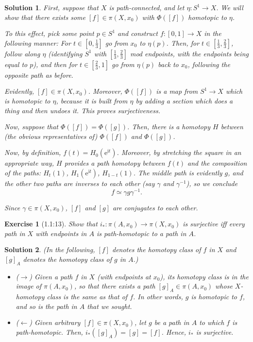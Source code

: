 \documentclass{article}
\theoremstyle{plain}
\newtheorem*{ex}{Exercise}
\theoremstyle{nonumberplain}
\newtheorem{sol}{Solution}
\newcommand{\I}{\mathrm{i}}
\newcommand{\e}{\mathrm{e}}
\begin{document}
\begin{sol}
First, suppose that $X$ is path-connected, and let $\eta \colon S^1 \to X$. We will show that there exists some $[f] \in \pi(X,x_0)$ with $\Phi([f])$ homotopic to $\eta$.

To this effect, pick some point $p \in S^1$ and construct $f \colon [0,1] \to X$ in the following manner: For $t \in [0,\frac13]$ go from $x_0$ to $\eta(p)$. Then, for $t \in [\frac13,\frac23]$, follow along $\eta$ (identifying $S^1$ with $[\frac13,\frac23]$ mod endpoints, with the endpoints being equal to $p$), and then for $t \in [\frac23,1]$ go from $\eta(p)$ back to $x_0$, following the opposite path as before.

Evidently, $[f] \in \pi(X,x_0)$. Moreover, $\Phi([f])$ is a map from $S^1 \to X$ which is homotopic to $\eta$, because it is built from $\eta$ by adding a section which does a thing and then undoes it. This proves surjectiveness.

\smallskip

Now, suppose that $\Phi([f]) = \Phi([g])$. Then, there is a homotopy $H$ between (the obvious representatives of) $\Phi([f])$ and $\Phi([g])$.

Now, by definition, $f(t) = H_0(\e^{\I t})$. Moreover, by stretching the square in an appropriate way, $H$ provides a path homotopy between $f(t)$ and the composition of the paths: $H_t(1)$, $H_1(\e^{\I t})$, $H_{1-t}(1)$. The middle path is evidently $g$, and the other two paths are inverses to each other (say $\gamma$ and $\gamma^{-1}$), so we conclude
\begin{equation}
f \simeq \gamma g \gamma^{-1}.
\end{equation}

Since $\gamma \in \pi(X,x_0)$, $[f]$ and $[g]$ are conjugates to each other.
\end{sol}

\begin{ex}[1.1:13]
Show that $i_* \colon \pi(A,x_0) \to \pi(X,x_0)$ is surjective iff every path in $X$ with endpoints in $A$ is path-homotopic to a path in $A$.
\end{ex}

\begin{sol} (In the following, $[f]$ denotes the homotopy class of $f$ in $X$ and $[g]_A$ denotes the homotopy class of $g$ in $A$.)
\begin{itemize}
\item ($\rightarrow$) Given a path $f$ in $X$ (with endpoints at $x_0$), its homotopy class is in the image of $\pi(A,x_0)$, so that there exists a path $[g]_A \in \pi(A,x_0)$ whose $X$-homotopy class is the same as that of $f$. In other words, $g$ is homotopic to $f$, and so is the path in $A$ that we sought.

\item ($\leftarrow$) Given arbitrary $[f] \in \pi(X,x_0)$, let $g$ be a path in $A$ to which $f$ is path-homotopic. Then, $i_*([g]_A) = [g] = [f]$. Hence, $i_*$ is surjective.
\end{itemize}
\end{sol}
\end{document}
